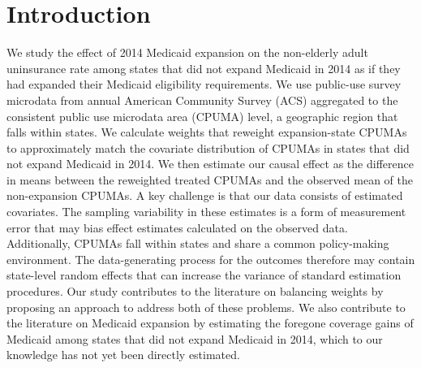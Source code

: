 \documentclass[aoas]{imsart}
\theoremstyle{plain}
\theoremstyle{remark}
\begin{document}


\section{Introduction}

We study the effect of 2014 Medicaid expansion on the non-elderly adult uninsurance rate among states that did not expand Medicaid in 2014 as if they had expanded their Medicaid eligibility requirements. We use public-use survey microdata from annual American Community Survey (ACS) aggregated to the consistent public use microdata area (CPUMA) level, a geographic region that falls within states. We calculate weights that reweight expansion-state CPUMAs to approximately match the covariate distribution of CPUMAs in states that did not expand Medicaid in 2014. We then estimate our causal effect as the difference in means between the reweighted treated CPUMAs and the observed mean of the non-expansion CPUMAs. A key challenge is that our data consists of estimated covariates. The sampling variability in these estimates is a form of measurement error that may bias effect estimates calculated on the observed data. Additionally, CPUMAs fall within states and share a common policy-making environment. The data-generating process for the outcomes therefore may contain state-level random effects that can increase the variance of standard estimation procedures. Our study contributes to the literature on balancing weights by proposing an approach to address both of these problems. We also contribute to the literature on Medicaid expansion by estimating the foregone coverage gains of Medicaid among states that did not expand Medicaid in 2014, which to our knowledge has not yet been directly estimated.
\end{document}
